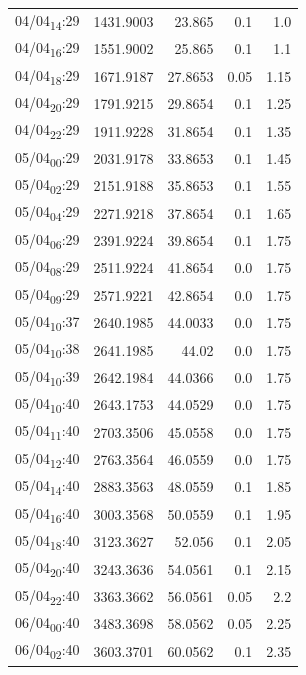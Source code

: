\documentclass[11pt]{article}
\begin{document}
\begin{center}
\begin{tabular}{lrrrr}
04/04\textsubscript{14}:29 & 1431.9003 & 23.865 & 0.1 & 1.0\\[0pt]
04/04\textsubscript{16}:29 & 1551.9002 & 25.865 & 0.1 & 1.1\\[0pt]
04/04\textsubscript{18}:29 & 1671.9187 & 27.8653 & 0.05 & 1.15\\[0pt]
04/04\textsubscript{20}:29 & 1791.9215 & 29.8654 & 0.1 & 1.25\\[0pt]
04/04\textsubscript{22}:29 & 1911.9228 & 31.8654 & 0.1 & 1.35\\[0pt]
05/04\textsubscript{00}:29 & 2031.9178 & 33.8653 & 0.1 & 1.45\\[0pt]
05/04\textsubscript{02}:29 & 2151.9188 & 35.8653 & 0.1 & 1.55\\[0pt]
05/04\textsubscript{04}:29 & 2271.9218 & 37.8654 & 0.1 & 1.65\\[0pt]
05/04\textsubscript{06}:29 & 2391.9224 & 39.8654 & 0.1 & 1.75\\[0pt]
05/04\textsubscript{08}:29 & 2511.9224 & 41.8654 & 0.0 & 1.75\\[0pt]
05/04\textsubscript{09}:29 & 2571.9221 & 42.8654 & 0.0 & 1.75\\[0pt]
05/04\textsubscript{10}:37 & 2640.1985 & 44.0033 & 0.0 & 1.75\\[0pt]
05/04\textsubscript{10}:38 & 2641.1985 & 44.02 & 0.0 & 1.75\\[0pt]
05/04\textsubscript{10}:39 & 2642.1984 & 44.0366 & 0.0 & 1.75\\[0pt]
05/04\textsubscript{10}:40 & 2643.1753 & 44.0529 & 0.0 & 1.75\\[0pt]
05/04\textsubscript{11}:40 & 2703.3506 & 45.0558 & 0.0 & 1.75\\[0pt]
05/04\textsubscript{12}:40 & 2763.3564 & 46.0559 & 0.0 & 1.75\\[0pt]
05/04\textsubscript{14}:40 & 2883.3563 & 48.0559 & 0.1 & 1.85\\[0pt]
05/04\textsubscript{16}:40 & 3003.3568 & 50.0559 & 0.1 & 1.95\\[0pt]
05/04\textsubscript{18}:40 & 3123.3627 & 52.056 & 0.1 & 2.05\\[0pt]
05/04\textsubscript{20}:40 & 3243.3636 & 54.0561 & 0.1 & 2.15\\[0pt]
05/04\textsubscript{22}:40 & 3363.3662 & 56.0561 & 0.05 & 2.2\\[0pt]
06/04\textsubscript{00}:40 & 3483.3698 & 58.0562 & 0.05 & 2.25\\[0pt]
06/04\textsubscript{02}:40 & 3603.3701 & 60.0562 & 0.1 & 2.35\\[0pt]

\end{tabular}
\end{center}
\end{document}
